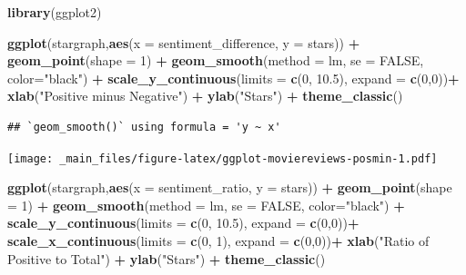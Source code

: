 \documentclass[
]{book}
\newenvironment{Shaded}{\begin{snugshade}}{\end{snugshade}}
\newcommand{\AttributeTok}[1]{\textcolor[rgb]{0.13,0.29,0.53}{#1}}
\newcommand{\ConstantTok}[1]{\textcolor[rgb]{0.56,0.35,0.01}{#1}}
\newcommand{\DecValTok}[1]{\textcolor[rgb]{0.00,0.00,0.81}{#1}}
\newcommand{\FloatTok}[1]{\textcolor[rgb]{0.00,0.00,0.81}{#1}}
\newcommand{\FunctionTok}[1]{\textcolor[rgb]{0.13,0.29,0.53}{\textbf{#1}}}
\newcommand{\NormalTok}[1]{#1}
\newcommand{\SpecialCharTok}[1]{\textcolor[rgb]{0.81,0.36,0.00}{\textbf{#1}}}
\newcommand{\StringTok}[1]{\textcolor[rgb]{0.31,0.60,0.02}{#1}}
\begin{document}
\begin{Shaded}
\begin{Highlighting}[]
\FunctionTok{library}\NormalTok{(ggplot2)}

\FunctionTok{ggplot}\NormalTok{(stargraph,}\FunctionTok{aes}\NormalTok{(}\AttributeTok{x =}\NormalTok{ sentiment\_difference, }\AttributeTok{y =}\NormalTok{ stars)) }\SpecialCharTok{+}
 \FunctionTok{geom\_point}\NormalTok{(}\AttributeTok{shape =} \DecValTok{1}\NormalTok{) }\SpecialCharTok{+}
 \FunctionTok{geom\_smooth}\NormalTok{(}\AttributeTok{method =}\NormalTok{ lm, }\AttributeTok{se =} \ConstantTok{FALSE}\NormalTok{, }\AttributeTok{color=}\StringTok{"black"}\NormalTok{) }\SpecialCharTok{+}
 \FunctionTok{scale\_y\_continuous}\NormalTok{(}\AttributeTok{limits =} \FunctionTok{c}\NormalTok{(}\DecValTok{0}\NormalTok{, }\FloatTok{10.5}\NormalTok{), }\AttributeTok{expand =} \FunctionTok{c}\NormalTok{(}\DecValTok{0}\NormalTok{,}\DecValTok{0}\NormalTok{))}\SpecialCharTok{+}
 \FunctionTok{xlab}\NormalTok{(}\StringTok{"Positive minus Negative"}\NormalTok{) }\SpecialCharTok{+}
 \FunctionTok{ylab}\NormalTok{(}\StringTok{"Stars"}\NormalTok{) }\SpecialCharTok{+}
 \FunctionTok{theme\_classic}\NormalTok{()}
\end{Highlighting}
\end{Shaded}

\begin{verbatim}
## `geom_smooth()` using formula = 'y ~ x'
\end{verbatim}

\texttt{[image: \_main\_files/figure-latex/ggplot-moviereviews-posmin-1.pdf]}

\begin{Shaded}
\begin{Highlighting}[]
\FunctionTok{ggplot}\NormalTok{(stargraph,}\FunctionTok{aes}\NormalTok{(}\AttributeTok{x =}\NormalTok{ sentiment\_ratio, }\AttributeTok{y =}\NormalTok{ stars)) }\SpecialCharTok{+}
 \FunctionTok{geom\_point}\NormalTok{(}\AttributeTok{shape =} \DecValTok{1}\NormalTok{) }\SpecialCharTok{+}
 \FunctionTok{geom\_smooth}\NormalTok{(}\AttributeTok{method =}\NormalTok{ lm, }\AttributeTok{se =} \ConstantTok{FALSE}\NormalTok{, }\AttributeTok{color=}\StringTok{"black"}\NormalTok{) }\SpecialCharTok{+}
 \FunctionTok{scale\_y\_continuous}\NormalTok{(}\AttributeTok{limits =} \FunctionTok{c}\NormalTok{(}\DecValTok{0}\NormalTok{, }\FloatTok{10.5}\NormalTok{), }\AttributeTok{expand =} \FunctionTok{c}\NormalTok{(}\DecValTok{0}\NormalTok{,}\DecValTok{0}\NormalTok{))}\SpecialCharTok{+}
 \FunctionTok{scale\_x\_continuous}\NormalTok{(}\AttributeTok{limits =} \FunctionTok{c}\NormalTok{(}\DecValTok{0}\NormalTok{, }\DecValTok{1}\NormalTok{), }\AttributeTok{expand =} \FunctionTok{c}\NormalTok{(}\DecValTok{0}\NormalTok{,}\DecValTok{0}\NormalTok{))}\SpecialCharTok{+}
 \FunctionTok{xlab}\NormalTok{(}\StringTok{"Ratio of Positive to Total"}\NormalTok{) }\SpecialCharTok{+}
 \FunctionTok{ylab}\NormalTok{(}\StringTok{"Stars"}\NormalTok{) }\SpecialCharTok{+}
 \FunctionTok{theme\_classic}\NormalTok{()}
\end{Highlighting}
\end{Shaded}
\end{document}
